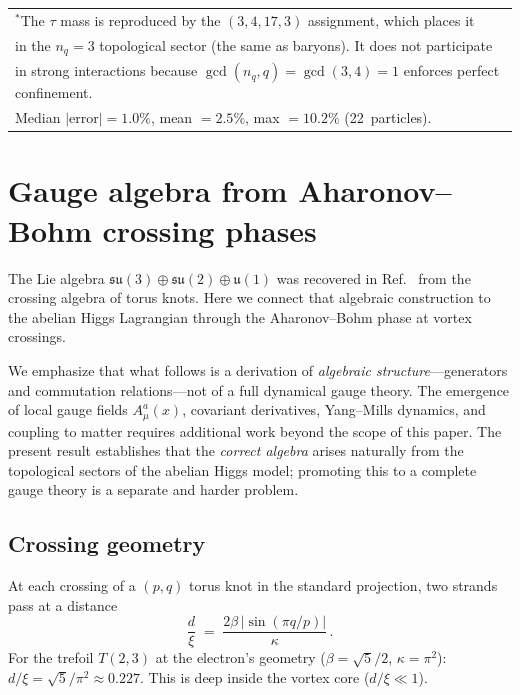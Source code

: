 \documentclass[11pt]{article}
\begin{document}
\begin{table}[t]
\begin{tabular}{lcrrrrrl}
\midrule
\multicolumn{8}{l}{\small $^*$The $\tau$ mass is reproduced by the $(3,4,17,3)$ assignment,
    which places it} \\
\multicolumn{8}{l}{\small \phantom{$^*$}in the $n_q=3$ topological sector (the same as baryons).
    It does not participate} \\
\multicolumn{8}{l}{\small \phantom{$^*$}in strong interactions because $\gcd(n_q,q) = \gcd(3,4) = 1$
    enforces perfect confinement.} \\
\multicolumn{8}{l}{\small Median $|$error$| = 1.0\%$,
    mean $= 2.5\%$, max $= 10.2\%$ (22~particles).} \\
\bottomrule
\end{tabular}
\end{table}


\section{Gauge algebra from Aharonov--Bohm crossing phases}
\label{sec:gauge}

The Lie algebra $\mathfrak{su}(3)\oplus\mathfrak{su}(2)\oplus
\mathfrak{u}(1)$ was recovered in Ref.~\cite{NWT8} from the crossing
algebra of torus knots.  Here we connect that algebraic construction
to the abelian Higgs Lagrangian through the Aharonov--Bohm phase
at vortex crossings.

We emphasize that what follows is a derivation of \emph{algebraic
structure}---generators and commutation relations---not of a full
dynamical gauge theory.  The emergence of local gauge fields
$A_\mu^a(x)$, covariant derivatives, Yang--Mills dynamics, and
coupling to matter requires additional work beyond the scope of
this paper.  The present result establishes that the
\emph{correct algebra} arises naturally from the topological
sectors of the abelian Higgs model; promoting this to a complete
gauge theory is a separate and harder problem.

\subsection{Crossing geometry}

At each crossing of a $(p,q)$ torus knot in the standard projection,
two strands pass at a distance
\begin{equation}
\label{eq:crossing_distance}
\frac{d}{\xi} \;=\; \frac{2\beta\,|\sin(\pi q/p)|}{\kappa}\,.
\end{equation}
For the trefoil $T(2,3)$ at the electron's geometry
($\beta = \sqrt{5}/2$, $\kappa = \pi^2$):
$d/\xi = \sqrt{5}/\pi^2 \approx 0.227$.  This is deep inside the
vortex core ($d/\xi \ll 1$).
\end{document}
